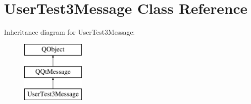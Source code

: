 \hypertarget{class_user_test3_message}{}\section{User\+Test3\+Message Class Reference}
\label{class_user_test3_message}
Inheritance diagram for User\+Test3\+Message\+:\begin{figure}[H]
\begin{center}
\leavevmode
\includegraphics[height=3.000000cm]{class_user_test3_message}
\end{center}
\end{figure}
